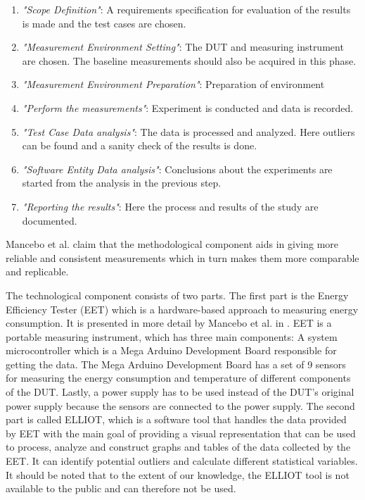 \begin{enumerate}
    \item \textit{"Scope Definition"}: A requirements specification for evaluation of the results is made and the test cases are chosen.
    \item \textit{"Measurement Environment Setting"}: The DUT and measuring instrument are chosen. The baseline measurements should also be acquired in this phase.
    \item \textit{"Measurement Environment Preparation"}: Preparation of environment
    \item \textit{"Perform the measurements"}: Experiment is conducted and data is recorded. 
    \item \textit{"Test Case Data analysis"}: The data is processed and analyzed. Here outliers can be found and a sanity check of the results is done.
    \item \textit{"Software Entity Data analysis"}: Conclusions about the experiments are started from the analysis in the previous step.
    \item \textit{"Reporting the results"}: Here the process and results of the study are documented. 
\end{enumerate} 

Mancebo et al.\cite{GarciaFEETINGS} claim that the methodological component aids in giving more reliable and consistent measurements which in turn makes them more comparable and replicable.

The technological component consists of two parts. The first part is the Energy Efficiency Tester (EET) which is a hardware-based approach to measuring energy consumption. It is presented in more detail by Mancebo et al. in \cite{GarciaEET}. EET is a portable measuring instrument, which has three main components: A system microcontroller which is a Mega Arduino Development Board responsible for getting the data. The Mega Arduino Development Board has a set of 9 sensors for measuring the energy consumption and temperature of different components of the DUT. Lastly, a power supply has to be used instead of the DUT's original power supply because the sensors are connected to the power supply.\cite{GarciaEET} The second part is called ELLIOT, which is a software tool that handles the data provided by EET with the main goal of providing a visual representation that can be used to process, analyze and construct graphs and tables of the data collected by the EET. It can identify potential outliers and calculate different statistical variables.\cite{GarciaFEETINGS} It should be noted that to the extent of our knowledge, the ELLIOT tool is not available to the public and can therefore not be used.\newline

